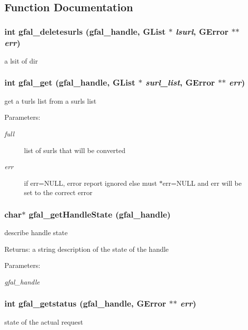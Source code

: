 \subsection{Function Documentation}
\subsubsection{\setlength{\rightskip}{0pt plus 5cm}int gfal\_\-deletesurls (gfal\_\-handle, GList $\ast$ {\em lsurl}, GError $\ast$$\ast$ {\em err})}\label{group__srm__group_gfb4d82067ddab76a4755a8d8bf6be299}


a lsit of dir 
\subsubsection{\setlength{\rightskip}{0pt plus 5cm}int gfal\_\-get (gfal\_\-handle, GList $\ast$ {\em surl\_\-list}, GError $\ast$$\ast$ {\em err})}\label{group__srm__group_g72241d4a54f2d555838376723c4fe106}


get a turls list from a surls list 

\begin{Desc}
\item[Parameters:]
\begin{description}
\item[{\em full}]list of surls that will be converted \item[{\em err}]if err=NULL, error report ignored else must $\ast$err=NULL and err will be set to the correct error \end{description}
\end{Desc}
\subsubsection{\setlength{\rightskip}{0pt plus 5cm}char$\ast$ gfal\_\-get\-Handle\-State (gfal\_\-handle)}\label{group__srm__group_gb850010181be27c87a5c5b0341412655}


describe handle state 

\begin{Desc}
\item[Returns:]a string description of the state of the handle \end{Desc}
\begin{Desc}
\item[Parameters:]
\begin{description}
\item[{\em gfal\_\-handle}]\end{description}
\end{Desc}
\subsubsection{\setlength{\rightskip}{0pt plus 5cm}int gfal\_\-getstatus (gfal\_\-handle, GError $\ast$$\ast$ {\em err})}\label{group__srm__group_g0de517db68fac8b99b6e4cf3ab413485}


state of the actual request 